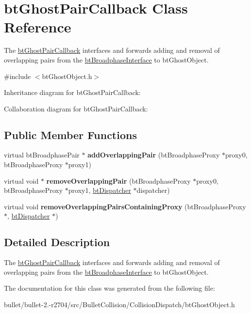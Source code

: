 \hypertarget{classbt_ghost_pair_callback}{\section{bt\+Ghost\+Pair\+Callback Class Reference}
\label{classbt_ghost_pair_callback}
}


The \hyperlink{classbt_ghost_pair_callback}{bt\+Ghost\+Pair\+Callback} interfaces and forwards adding and removal of overlapping pairs from the \hyperlink{classbt_broadphase_interface}{bt\+Broadphase\+Interface} to bt\+Ghost\+Object.  




{\ttfamily \#include $<$bt\+Ghost\+Object.\+h$>$}



Inheritance diagram for bt\+Ghost\+Pair\+Callback\+:


Collaboration diagram for bt\+Ghost\+Pair\+Callback\+:
\subsection*{Public Member Functions}
\begin{DoxyCompactItemize}
\item 
\hypertarget{classbt_ghost_pair_callback_ab7f244b881471dfe7ba8ed92f4b7f30f}{virtual bt\+Broadphase\+Pair $\ast$ {\bfseries add\+Overlapping\+Pair} (bt\+Broadphase\+Proxy $\ast$proxy0, bt\+Broadphase\+Proxy $\ast$proxy1)}\label{classbt_ghost_pair_callback_ab7f244b881471dfe7ba8ed92f4b7f30f}

\item 
\hypertarget{classbt_ghost_pair_callback_a486c0047f31e9eca3e99d78500a989d4}{virtual void $\ast$ {\bfseries remove\+Overlapping\+Pair} (bt\+Broadphase\+Proxy $\ast$proxy0, bt\+Broadphase\+Proxy $\ast$proxy1, \hyperlink{classbt_dispatcher}{bt\+Dispatcher} $\ast$dispatcher)}\label{classbt_ghost_pair_callback_a486c0047f31e9eca3e99d78500a989d4}

\item 
\hypertarget{classbt_ghost_pair_callback_af0107f58ace1c7421f51f9bf026dc57f}{virtual void {\bfseries remove\+Overlapping\+Pairs\+Containing\+Proxy} (bt\+Broadphase\+Proxy $\ast$, \hyperlink{classbt_dispatcher}{bt\+Dispatcher} $\ast$)}\label{classbt_ghost_pair_callback_af0107f58ace1c7421f51f9bf026dc57f}

\end{DoxyCompactItemize}


\subsection{Detailed Description}
The \hyperlink{classbt_ghost_pair_callback}{bt\+Ghost\+Pair\+Callback} interfaces and forwards adding and removal of overlapping pairs from the \hyperlink{classbt_broadphase_interface}{bt\+Broadphase\+Interface} to bt\+Ghost\+Object. 

The documentation for this class was generated from the following file\+:\begin{DoxyCompactItemize}
\item 
bullet/bullet-\/2.-\/r2704/src/\+Bullet\+Collision/\+Collision\+Dispatch/bt\+Ghost\+Object.\+h\end{DoxyCompactItemize}
